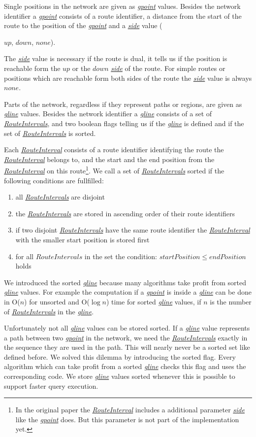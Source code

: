 \documentclass[a4paper]{article}
\newcommand{\dt}[1]{\textsl{\underline{#1}}}
\begin{document}
Single positions in the network are given as \dt{gpoint} values. Besides the
network identifier a \dt{gpoint} consists of a route identifier, a distance from
the start of the route to the position of the \dt{gpoint} and a \dt{side} value
({$up$, $down$, $none$).

The \dt{side} value is necessary if the route is dual, it tells us if the position
is reachable form the $up$ or the $down$ \dt{side} of the route. For simple
routes or positions which are reachable form both sides of the route the \dt{side}
value is always $none$.

Parts of the network, regardless if they represent paths or regions, are given as
\dt{gline} values. Besides the network identifier a \dt{gline} consists of a set
of \dt{RouteIntervals}, and two boolean flags telling us if the \dt{gline} is defined
and if the set of \dt{RouteIntervals} is sorted.

Each \dt{RouteInterval} consists of a route identifier identifying the route
the \dt{RouteInterval} belongs to, and the start and the end position from the
\dt{RouteInterval} on this route\footnote{In the original paper the
 \dt{RouteInterval}
includes a additional parameter \dt{side} like the \dt{gpoint} does. But this
parameter is not part of the implementation yet.}. We call a \label{sec:sortedgline}
set of \dt{RouteIntervals} sorted if the following conditions are fullfilled:
\begin{enumerate}
	\item all \dt{RouteIntervals} are disjoint
	\item the \dt{RouteIntervals} are stored in ascending order of their route identifiers
	\item if two disjoint \dt{RouteIntervals} have the same route identifier the \dt{RouteInterval} with the smaller start position is stored first
	\item for all $RouteIntervals$ in the set the condition: $startPosition \le endPosition$ holds
\end{enumerate}
We introduced the sorted \dt{gline} because many algorithms take profit from sorted
\dt{gline} values. For example the computation if a \dt{gpoint} is inside a
\dt{gline} can be done in O($n$) for unsorted and O($\log n$) time for
sorted \dt{gline} values, if $n$ is the number of \dt{RouteIntervals} in the
\dt{gline}.

Unfortunately not all \dt{gline} values can be stored sorted. If a \dt{gline}
value represents a path between two \dt{gpoint} in the network, we need the
\dt{RouteIntervals} exactly in the sequence they are used in the path. This will
nearly never be a sorted set like defined before. We solved this dilemma by
introducing the sorted flag. Every algorithm which can take profit from a sorted
\dt{gline} checks this flag and uses the corresponding code. We store \dt{gline}
values sorted whenever this is possible to support faster query execution.

}
\end{document}
